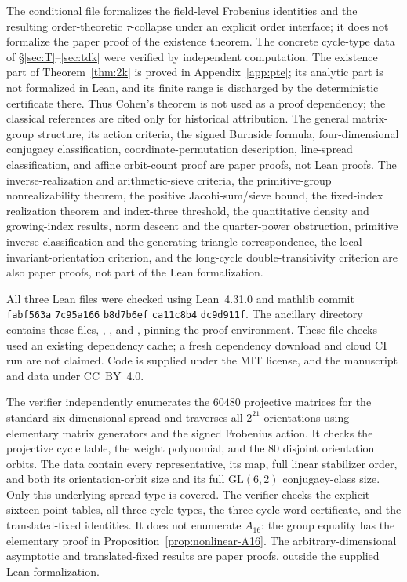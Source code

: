 \documentclass[11pt]{article}
\newcommand{\hashpart}[1]{\texttt{#1}\allowbreak}
\begin{document}
The conditional file
formalizes the field-level Frobenius identities and the resulting
order-theoretic $\tau$-collapse under an explicit order interface; it does not
formalize the paper proof of the existence theorem. The concrete cycle-type data of
\S\ref{sec:T}--\ref{sec:tdk} were verified by independent computation. The existence
part of Theorem~\ref{thm:2k} is proved in Appendix~\ref{app:pte}; its analytic part
is not formalized in Lean, and its finite range is discharged by the deterministic
certificate there. Thus Cohen's theorem is not used as a proof dependency; the
classical references are cited only for historical attribution. The general matrix-group structure, its action criteria, the signed Burnside
formula, four-dimensional conjugacy classification, coordinate-permutation
description, line-spread classification, and affine orbit-count proof are
paper proofs, not Lean proofs. The inverse-realization and arithmetic-sieve criteria, the
primitive-group nonrealizability theorem, the positive Jacobi-sum/sieve
bound, the fixed-index realization theorem and index-three threshold,
the quantitative density and growing-index results, norm descent and
the quarter-power obstruction, primitive inverse classification and
the generating-triangle correspondence,
the local invariant-orientation
criterion, and the long-cycle double-transitivity criterion are also
paper proofs, not part of the Lean formalization.

All three Lean files were checked using Lean~4.31.0 and mathlib commit
\hashpart{fabf563a}%
\hashpart{7c95a166}%
\hashpart{b8d7b6ef}%
\hashpart{ca11c8b4}%
\hashpart{dc9d911f}. The ancillary  directory contains these files,
, , and
, pinning the proof environment.
These file checks used an existing dependency cache; a fresh dependency download
and cloud CI run are not claimed. Code is supplied under the MIT license, and
the manuscript and data under CC~BY~4.0.


The verifier  independently enumerates
the $60480$ projective matrices for the standard six-dimensional spread
and traverses all $2^{21}$ orientations using elementary matrix generators
and the signed Frobenius action. It checks the projective cycle table,
the weight polynomial, and the $80$ disjoint orientation orbits.
The data  contain every representative,
its map, full linear stabilizer order, and both its orientation-orbit
size and its full $\mathrm{GL}(6,2)$ conjugacy-class size.
Only this underlying spread type is covered.
The verifier  checks the explicit
sixteen-point tables, all three cycle types, the three-cycle word
certificate, and the translated-fixed identities.
It does not enumerate $A_{16}$: the group equality has the elementary
proof in Proposition~\ref{prop:nonlinear-A16}.
The arbitrary-dimensional asymptotic and translated-fixed results
are paper proofs, outside the supplied Lean formalization.
\end{document}

